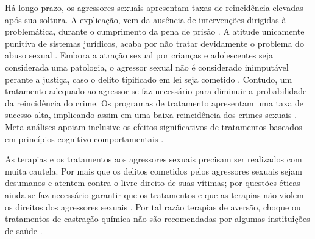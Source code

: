 
Há longo prazo, os agressores sexuais apresentam taxas de reincidência elevadas após sua soltura. A explicação, vem da ausência de intervenções dirigidas à problemática, durante o cumprimento da pena de prisão \cite{ribeiro2018programas, finkelhor2009prevention, maia2014castraccao}. A atitude unicamente punitiva de sistemas jurídicos, acaba por não tratar devidamente o problema do abuso sexual \cite{Camila2019}. Embora a atração sexual por crianças e adolescentes seja considerada uma patologia, o agressor sexual não é considerado inimputável perante a justiça, caso o delito tipificado em lei seja cometido \cite{ribeiro2018programas}. Contudo, um tratamento adequado ao agressor se faz necessário para diminuir a probabilidade da reincidência do crime. Os programas de tratamento apresentam uma taxa de sucesso alta, implicando assim em uma baixa reincidência dos crimes sexuais \cite{ribeiro2018programas}. Meta-análises apoiam inclusive os efeitos significativos de tratamentos baseados em princípios cognitivo-comportamentais \cite{mendelson2015parent}.

As terapias e os tratamentos aos agressores sexuais precisam ser realizados com muita cautela. Por mais que os delitos cometidos pelos agressores sexuais sejam desumanos e atentem contra o livre direito de suas vítimas; por questões éticas ainda se faz necessário garantir que os tratamentos e que as terapias não violem os direitos dos agressores sexuais \cite{finkelhor2009prevention}. Por tal razão terapias de aversão, choque ou tratamentos de castração química não são recomendadas por algumas instituições de saúde \cite{maia2014castraccao}.




